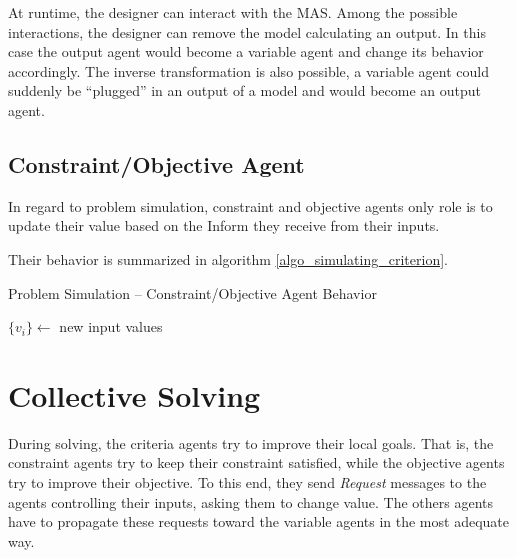 At runtime, the designer can interact with the MAS. Among the possible interactions, the designer can remove the model calculating an output. In this case the output agent would become a variable agent and change its behavior accordingly. The inverse transformation is also possible, a variable agent could suddenly be \enquote{plugged} in an output of a model and would become an output agent.

\subsection{Constraint/Objective Agent}

In regard to problem simulation, constraint and objective agents only role is to update their value based on the Inform they receive from their inputs.

Their behavior is summarized in algorithm \ref{algo_simulating_criterion}.

\begin{algorithm}
\caption{Problem Simulation -- Constraint/Objective Agent Behavior}
\label{algo_simulating_criterion}

	$\{v_i\} \leftarrow$ new input values\;
			

\end{algorithm}

\section{Collective Solving}\label{collective_solv}

During solving, the criteria agents try to improve their local goals. That is, the constraint agents try to keep their constraint satisfied, while the objective agents try to improve their objective. To this end, they send \emph{Request} messages to the agents controlling their inputs, asking them to change value. The others agents have to propagate these requests toward the variable agents in the most adequate way.

